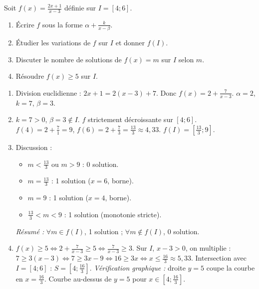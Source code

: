 \documentclass[11pt]{article}
\begin{document}
\begin{exercice}
Soit $f(x)=\frac{2x+1}{x-3}$ définie sur $I=[4;6]$.
\begin{enumerate}
\item Écrire $f$ sous la forme $\alpha+\frac{k}{x-\beta}$.
\item Étudier les variations de $f$ sur $I$ et donner $f(I)$.
\item Discuter le nombre de solutions de $f(x)=m$ sur $I$ selon $m$.
\item Résoudre $f(x) \ge 5$ sur $I$.
\end{enumerate}
\end{exercice}

\begin{corrige}
\begin{enumerate}
\item Division euclidienne : $2x+1 = 2(x-3)+7$. Donc $f(x)=2+\frac{7}{x-3}$. $\alpha=2$, $k=7$, $\beta=3$.
\item $k=7>0$, $\beta=3\notin I$. $f$ strictement décroissante sur $[4;6]$.
  $f(4)=2+\frac{7}{1}=9$, $f(6)=2+\frac{7}{3}=\frac{13}{3}\approx 4,33$.
  $f(I)=[\frac{13}{3};9]$.
\item Discussion :
  \begin{itemize}
  \item $m < \frac{13}{3}$ ou $m > 9$ : 0 solution.
  \item $m = \frac{13}{3}$ : 1 solution ($x=6$, borne).
  \item $m = 9$ : 1 solution ($x=4$, borne).
  \item $\frac{13}{3} < m < 9$ : 1 solution (monotonie stricte).
  \end{itemize}
  \emph{Résumé :} $\forall m\in f(I)$, 1 solution ; $\forall m\notin f(I)$, 0 solution.
\item $f(x) \ge 5 \Leftrightarrow 2+\frac{7}{x-3} \ge 5 \Leftrightarrow \frac{7}{x-3} \ge 3$.
  Sur $I$, $x-3>0$, on multiplie : $7 \ge 3(x-3) \Leftrightarrow 7 \ge 3x-9 \Leftrightarrow 16 \ge 3x \Leftrightarrow x \le \frac{16}{3}\approx 5,33$.
  Intersection avec $I=[4;6]$ : $S = [4;\frac{16}{3}]$.
  \emph{Vérification graphique :} droite $y=5$ coupe la courbe en $x=\frac{16}{3}$. Courbe au-dessus de $y=5$ pour $x\in[4;\frac{16}{3}]$.
\end{enumerate}
\end{corrige}
\end{document}
